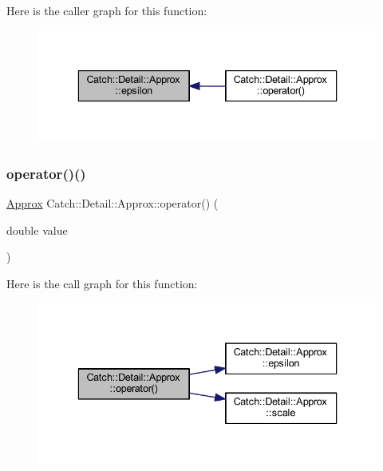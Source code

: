 Here is the caller graph for this function\+:\nopagebreak
\begin{figure}[H]
\begin{center}
\leavevmode
\includegraphics[width=336pt]{class_catch_1_1_detail_1_1_approx_a05c50c3ad0a971fab19345b5d94979a9_icgraph}
\end{center}
\end{figure}
\hypertarget{class_catch_1_1_detail_1_1_approx_a48c9cbc28a05dc9dc8c3973b9eae2268}{}\label{class_catch_1_1_detail_1_1_approx_a48c9cbc28a05dc9dc8c3973b9eae2268} 
\subsubsection{\texorpdfstring{operator()()}{operator()()}}
{\footnotesize\ttfamily \hyperlink{class_catch_1_1_detail_1_1_approx}{Approx} Catch\+::\+Detail\+::\+Approx\+::operator() (\begin{DoxyParamCaption}\item[{double}]{value }\end{DoxyParamCaption})\hspace{0.3cm}{\ttfamily [inline]}}

Here is the call graph for this function\+:\nopagebreak
\begin{figure}[H]
\begin{center}
\leavevmode
\includegraphics[width=336pt]{class_catch_1_1_detail_1_1_approx_a48c9cbc28a05dc9dc8c3973b9eae2268_cgraph}
\end{center}
\end{figure}
\hypertarget{class_catch_1_1_detail_1_1_approx_acd80f0737bf38112beacd5ca95bef113}{}\label{class_catch_1_1_detail_1_1_approx_acd80f0737bf38112beacd5ca95bef113} 
